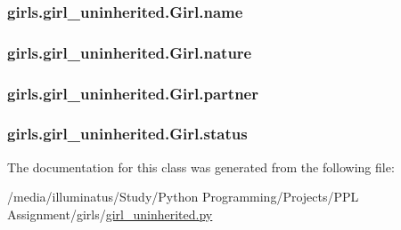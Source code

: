 \subsubsection[{\texorpdfstring{name}{name}}]{\setlength{\rightskip}{0pt plus 5cm}girls.\+girl\+\_\+uninherited.\+Girl.\+name}\hypertarget{classgirls_1_1girl__uninherited_1_1_girl_a17de9450938ef15ad772de7a1acfc197}{}\label{classgirls_1_1girl__uninherited_1_1_girl_a17de9450938ef15ad772de7a1acfc197}
\subsubsection[{\texorpdfstring{nature}{nature}}]{\setlength{\rightskip}{0pt plus 5cm}girls.\+girl\+\_\+uninherited.\+Girl.\+nature}\hypertarget{classgirls_1_1girl__uninherited_1_1_girl_af4b8bfdd9e572a69ce4f5bd047fe4aad}{}\label{classgirls_1_1girl__uninherited_1_1_girl_af4b8bfdd9e572a69ce4f5bd047fe4aad}
\subsubsection[{\texorpdfstring{partner}{partner}}]{\setlength{\rightskip}{0pt plus 5cm}girls.\+girl\+\_\+uninherited.\+Girl.\+partner}\hypertarget{classgirls_1_1girl__uninherited_1_1_girl_ab24240732eeb6eff5749572e45cb9b97}{}\label{classgirls_1_1girl__uninherited_1_1_girl_ab24240732eeb6eff5749572e45cb9b97}
\subsubsection[{\texorpdfstring{status}{status}}]{\setlength{\rightskip}{0pt plus 5cm}girls.\+girl\+\_\+uninherited.\+Girl.\+status}\hypertarget{classgirls_1_1girl__uninherited_1_1_girl_afe707a9b1349debe5d388105fdfa73c6}{}\label{classgirls_1_1girl__uninherited_1_1_girl_afe707a9b1349debe5d388105fdfa73c6}


The documentation for this class was generated from the following file\+:\begin{DoxyCompactItemize}
\item 
/media/illuminatus/\+Study/\+Python Programming/\+Projects/\+P\+P\+L Assignment/girls/\hyperlink{girl__uninherited_8py}{girl\+\_\+uninherited.\+py}\end{DoxyCompactItemize}
